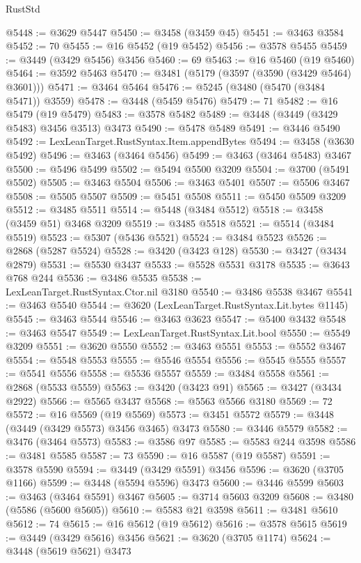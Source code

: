 \begin{lexlean}{RustStd}
\begin{coremodule}
{{{{{{{{{{{{{{{{{{{@5448 := @3629 @5447
@5450 := @3458 (@3459 @45)
@5451 := @3463 @3584
@5452 := 70
@5455 := @16 @5452 (@19 @5452)
@5456 := @3578 @5455
@5459 := @3449 (@3429 @5456) @3456
@5460 := 69
@5463 := @16 @5460 (@19 @5460)
@5464 := @3592 @5463
@5470 := @3481 (@5179 (@3597 (@3590 (@3429 @5464) @3601)))
@5471 := @3464 @5464
@5476 := @5245 (@3480 (@5470 (@3484 @5471)) @3559)
@5478 := @3448 (@5459 @5476)
@5479 := 71
@5482 := @16 @5479 (@19 @5479)
@5483 := @3578 @5482
@5489 := @3448 (@3449 (@3429 @5483) @3456 @3513) @3473
@5490 := @5478 @5489
@5491 := @3446 @5490
@5492 := LexLeanTarget.RustSyntax.Item.appendBytes
@5494 := @3458 (@3630 @5492)
@5496 := @3463 (@3464 @5456)
@5499 := @3463 (@3464 @5483) @3467
@5500 := @5496 @5499
@5502 := @5494 @5500 @3209
@5504 := @3700 (@5491 @5502)
@5505 := @3463 @5504
@5506 := @3463 @5401
@5507 := @5506 @3467
@5508 := @5505 @5507
@5509 := @5451 @5508
@5511 := @5450 @5509 @3209
@5512 := @3485 @5511
@5514 := @5448 (@3484 @5512)
@5518 := @3458 (@3459 @51) @3468 @3209
@5519 := @3485 @5518
@5521 := @5514 (@3484 @5519)
@5523 := @5307 (@5436 @5521)
@5524 := @3484 @5523
@5526 := @2868 (@5287 @5524)
@5528 := @3420 (@3423 @128)
@5530 := @3427 (@3434 @2879)
@5531 := @5530 @3437
@5533 := @5528 @5531 @3178
@5535 := @3643 @768 @244
@5536 := @3486 @5535
@5538 := LexLeanTarget.RustSyntax.Ctor.nil @3180
@5540 := @3486 @5538 @3467
@5541 := @3463 @5540
@5544 := @3620 (LexLeanTarget.RustSyntax.Lit.bytes @1145)
@5545 := @3463 @5544
@5546 := @3463 @3623
@5547 := @5400 @3432
@5548 := @3463 @5547
@5549 := LexLeanTarget.RustSyntax.Lit.bool
@5550 := @5549 @3209
@5551 := @3620 @5550
@5552 := @3463 @5551
@5553 := @5552 @3467
@5554 := @5548 @5553
@5555 := @5546 @5554
@5556 := @5545 @5555
@5557 := @5541 @5556
@5558 := @5536 @5557
@5559 := @3484 @5558
@5561 := @2868 (@5533 @5559)
@5563 := @3420 (@3423 @91)
@5565 := @3427 (@3434 @2922)
@5566 := @5565 @3437
@5568 := @5563 @5566 @3180
@5569 := 72
@5572 := @16 @5569 (@19 @5569)
@5573 := @3451 @5572
@5579 := @3448 (@3449 (@3429 @5573) @3456 @3465) @3473
@5580 := @3446 @5579
@5582 := @3476 (@3464 @5573)
@5583 := @3586 @97
@5585 := @5583 @244 @3598
@5586 := @3481 @5585
@5587 := 73
@5590 := @16 @5587 (@19 @5587)
@5591 := @3578 @5590
@5594 := @3449 (@3429 @5591) @3456
@5596 := @3620 (@3705 @1166)
@5599 := @3448 (@5594 @5596) @3473
@5600 := @3446 @5599
@5603 := @3463 (@3464 @5591) @3467
@5605 := @3714 @5603 @3209
@5608 := @3480 (@5586 (@5600 @5605))
@5610 := @5583 @21 @3598
@5611 := @3481 @5610
@5612 := 74
@5615 := @16 @5612 (@19 @5612)
@5616 := @3578 @5615
@5619 := @3449 (@3429 @5616) @3456
@5621 := @3620 (@3705 @1174)
@5624 := @3448 (@5619 @5621) @3473
}}}}}}}}}}}}}}}}}}}
\end{coremodule}
\end{lexlean}
